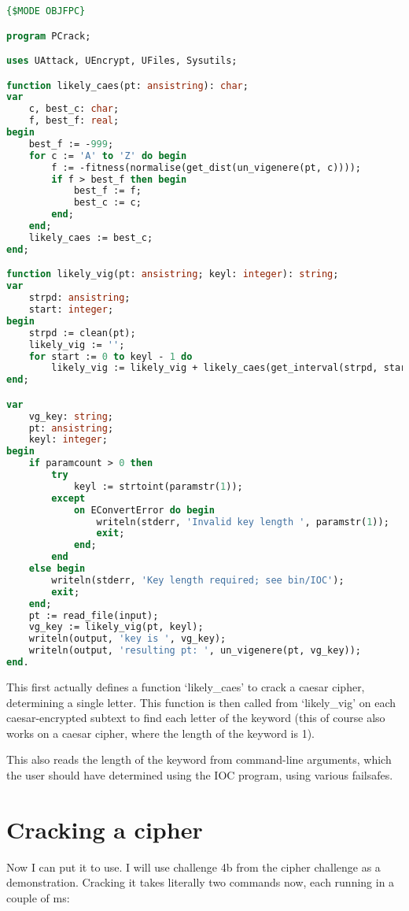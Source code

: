 \documentclass{article}
\begin{document}
\begin{lstlisting}[language=Pascal, caption=Keyword-cracking program (PCrack.pas)]
{$MODE OBJFPC}

program PCrack;

uses UAttack, UEncrypt, UFiles, Sysutils;

function likely_caes(pt: ansistring): char;
var
    c, best_c: char;
    f, best_f: real;
begin
    best_f := -999;
    for c := 'A' to 'Z' do begin
        f := -fitness(normalise(get_dist(un_vigenere(pt, c))));
        if f > best_f then begin
            best_f := f;
            best_c := c;
        end;
    end;
    likely_caes := best_c;
end;

function likely_vig(pt: ansistring; keyl: integer): string;
var
    strpd: ansistring;
    start: integer;
begin
    strpd := clean(pt);
    likely_vig := '';
    for start := 0 to keyl - 1 do
        likely_vig := likely_vig + likely_caes(get_interval(strpd, start, keyl));
end;

var
    vg_key: string;
    pt: ansistring;
    keyl: integer;
begin
    if paramcount > 0 then
        try
            keyl := strtoint(paramstr(1));
        except
            on EConvertError do begin
                writeln(stderr, 'Invalid key length ', paramstr(1));
                exit;
            end;
        end
    else begin
        writeln(stderr, 'Key length required; see bin/IOC');
        exit;
    end;
    pt := read_file(input);
    vg_key := likely_vig(pt, keyl);
    writeln(output, 'key is ', vg_key);
    writeln(output, 'resulting pt: ', un_vigenere(pt, vg_key));
end.
\end{lstlisting}
\iffalse $ \fi %

    This first actually defines a function `likely\_caes' to crack a caesar
    cipher, determining a single letter. This function is then called from
    `likely\_vig' on each caesar-encrypted subtext to find each letter of the
    keyword (this of course also works on a caesar cipher, where the length of
    the keyword is 1).

    This also reads the length of the keyword from command-line arguments,
    which the user should have determined using the IOC program, using various
    failsafes.

    \section{Cracking a cipher}

    Now I can put it to use. I will use challenge 4b from the cipher challenge
    as a demonstration. Cracking it takes literally two commands now, each
    running in a couple of ms:
\end{document}
